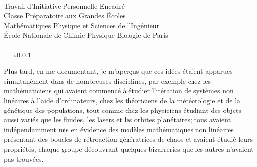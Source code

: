 %
%

\begin{titlepage}

\makeatletter
  \begin{flushright}
      {\textbf {\huge \@title}}\\
    \vspace{3em}
      {\Large Travail d'Initiative Personnelle Encadré}\\
      Classe Préparatoire aux Grandes Écoles\\
      Mathématiques Physique et Sciences de l'Ingénieur\\
      École Nationale de Chimie Physique Biologie de Paris\\
    \vspace{3em}
      {\large \@author}\\
      {\small \@date \space --- v0.0.1}
  \end{flushright}
\makeatother

\vfill

Plus tard, en me documentant, je
m'aperçus que ces idées étaient apparues
simultanément dans de nombreuses disciplines,
par exemple chez les mathématiciens qui
avaient commencé à étudier
l'itération de systèmes non linéaires à
l'aide d'ordinateurs, chez les théoriciens
de la météorologie et de la génétique des
populations, tout comme chez les physiciens
étudiant des objets aussi variés que
les fluides, les lasers et les orbites
planétaires; tous avaient indépendamment
mis en évidence des modèles
mathématiques non linéaires présentant
des boucles de rétroaction génératrices
de chaos et avaient étudié leurs propriétés,
chaque groupe découvrant quelques bizarreries
que les autres n'avaient
pas trouvées.

\end{titlepage}

\tableofcontents
